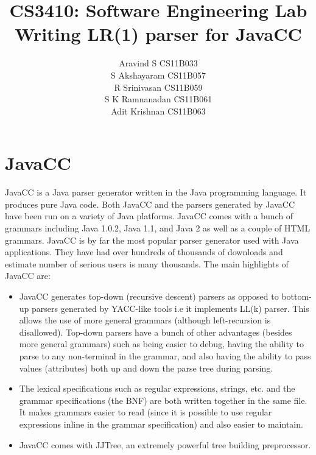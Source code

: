\documentclass{article}
\begin{document}
\title{\textbf{CS3410: Software Engineering Lab}
\\
\textbf{Writing LR(1) parser for JavaCC}}
\author{ Aravind S CS11B033 \\
		 S Akshayaram CS11B057\\
		 R Srinivasan CS11B059\\
		 S K Ramnanadan CS11B061\\
		 Adit Krishnan  CS11B063\\
[0.2in]
}
\maketitle
\section{JavaCC}
JavaCC is a Java parser generator written in the Java programming language. It produces pure Java code. Both JavaCC and the parsers generated by JavaCC have been run on a variety of Java platforms. JavaCC comes with a bunch of grammars including Java 1.0.2, Java 1.1, and Java 2 as well as a couple of HTML grammars.  JavaCC is by far the most popular parser generator used with Java applications. They have had over hundreds of thousands of downloads and estimate number of serious users is many thousands. The main highlights of JavaCC are:

\begin{itemize}
\item JavaCC generates top-down (recursive descent) parsers as opposed to bottom-up parsers generated by YACC-like tools i.e it implements LL(k) parser. This allows the use of more general grammars (although left-recursion is disallowed). Top-down parsers have a bunch of other advantages (besides more general grammars) such as being easier to debug, having the ability to parse to any non-terminal in the grammar, and also having the ability to pass values (attributes) both up and down the parse tree during parsing.

\item The lexical specifications such as regular expressions, strings, etc. and the grammar specifications (the BNF) are both written together in the same file. It makes grammars easier to read (since it is possible to use regular expressions inline in the grammar specification) and also easier to maintain.

\item JavaCC comes with JJTree, an extremely powerful tree building preprocessor.


\end{itemize}
\end{document}
